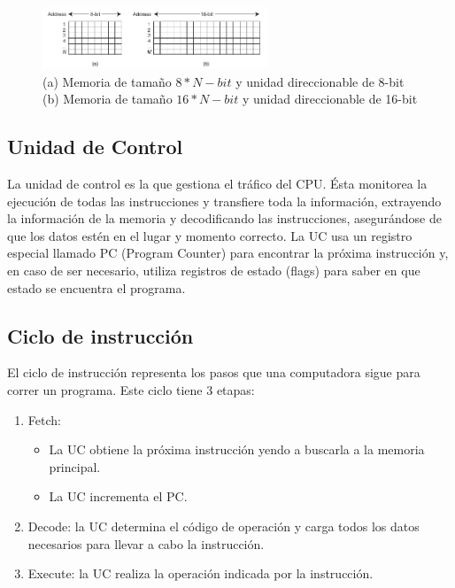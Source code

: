 \documentclass[a4paper,12pt]{article}
\begin{document}
\begin{figure}[ht!]
  \centering
   \includegraphics[width=0.6\textwidth]{Imagenes/MEMORIA.png}
  \caption{(a) Memoria de tamaño $8*N-bit$ y unidad direccionable de 8-bit (b) Memoria de tamaño $16*N-bit$ y unidad direccionable de 16-bit}
  \label{MEMORIA}
\end{figure}

\subsection{Unidad de Control}
La unidad de control es la que gestiona el tráfico del CPU. Ésta monitorea la ejecución de todas las instrucciones y
transfiere toda la información, extrayendo la información de la memoria y decodificando las instrucciones, asegurándose
de que los datos estén en el lugar y momento correcto. La UC usa un registro especial llamado PC (Program Counter) para
encontrar la próxima instrucción y, en caso de ser necesario, utiliza registros de estado (flags) para saber en que
estado se encuentra el programa.

\subsection{Ciclo de instrucción}
El ciclo de instrucción representa los pasos que una computadora sigue para correr un programa. Este ciclo tiene 3 etapas:
\begin{enumerate}
  \item Fetch:
  \begin{itemize}
    \item La UC obtiene la próxima instrucción yendo a buscarla a la memoria principal.
    \item La UC incrementa el PC.
  \end{itemize}
  \item Decode: la UC determina el código de operación y carga todos los datos necesarios para llevar a cabo la instrucción.
  \item Execute: la UC realiza la operación indicada por la instrucción.
\end{enumerate}
\end{document}

